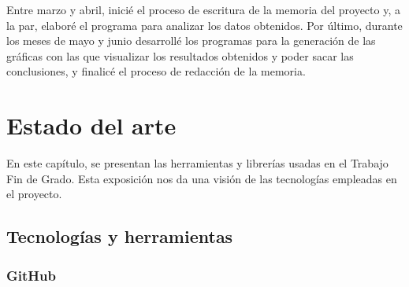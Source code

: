 \documentclass[a4paper, 12pt]{book}
\begin{document}
Entre marzo y abril, inicié el proceso de escritura de la memoria del proyecto y, a la par, elaboré el programa para analizar los datos obtenidos. 
Por último, durante los meses de mayo y junio desarrollé los programas para la generación de las gráficas con las que visualizar los resultados obtenidos y poder sacar las conclusiones, y finalicé el proceso de redacción de la memoria. 


\cleardoublepage
\chapter{Estado del arte}
\label{chap:estado}

En este capítulo, se presentan las herramientas y librerías usadas en el Trabajo Fin de Grado.
Esta exposición nos da una visión de las tecnologías empleadas en el proyecto.

\section{Tecnologías y herramientas} %
\label{sec:tecnologías y herramienta}

\subsection{GitHub} %
\label{sec:github} %
\end{document}
